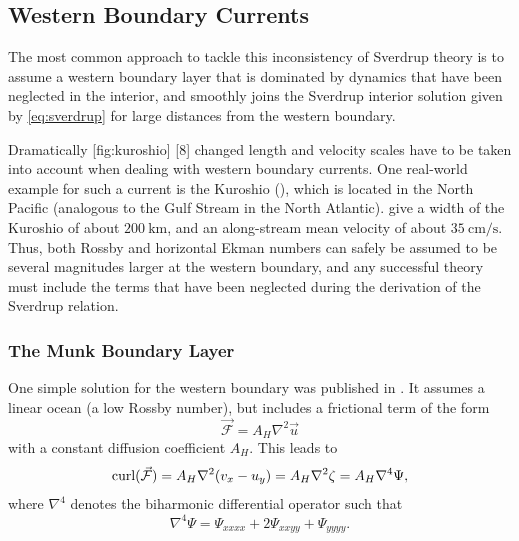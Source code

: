 \subsection{Western Boundary Currents} 
The most common approach to tackle this inconsistency of Sverdrup theory is to assume a western boundary layer that is dominated by dynamics that have been neglected in the interior, and smoothly joins the Sverdrup interior solution given by \eqref{eq:sverdrup} for large distances from the western boundary.

Dramatically%
[fig:kuroshio]{%
}[8]%
changed length and velocity scales have to be taken into account when dealing with western boundary currents. One real-world example for such a current is the Kuroshio (), which is located in the North Pacific (analogous to the Gulf Stream in the North Atlantic). \cite{liu} give a width of the Kuroshio of about \(\SI{200}{\kilo\metre}\), and an along-stream mean velocity of about \(\SI{35}{\centi\metre\per\second}\). Thus, both Rossby and horizontal Ekman numbers can safely be assumed to be several magnitudes larger at the western boundary, and any successful theory must include the terms that have been neglected during the derivation of the Sverdrup relation.

\subsubsection{The Munk Boundary Layer}
\label{sec:munk}
One simple solution for the western boundary was published in \cite{munk}. It assumes a linear ocean (\ie a low Rossby number), but includes a frictional term of the form
%
\begin{equation}
\vec{\mathcal{F}} = A_H \nabla^2 \vec{u}
\end{equation}
%
with a constant diffusion coefficient \(A_H\). This leads to
%
\begin{equation}
\text{curl}(\vec{\mathcal{F}}) = A_H \nabla^2 (v_x - u_y) = A_H \nabla^2 \zeta = A_H \nabla^4 \Psi, \label{eq:fricdiff}
\end{equation}
%
where \(\nabla^4\) denotes the biharmonic differential operator such that
%
\begin{equation}
\nabla^4 \Psi = \Psi_{xxxx} + 2 \Psi_{xxyy} + \Psi_{yyyy}.
\end{equation}


